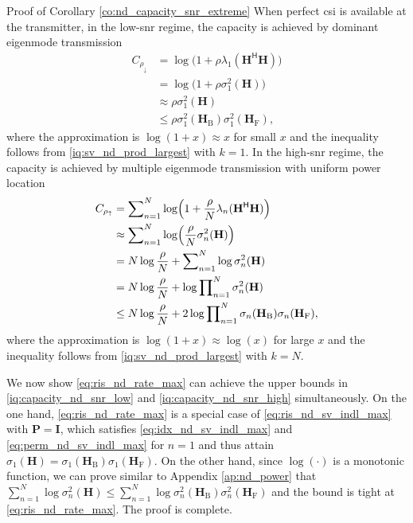 \documentclass[journal]{IEEEtran}
\begin{document}
\begin{appendix}
	\begin{subsection}{Proof of Corollary \ref{co:nd_capacity_snr_extreme}}
		\label{ap:nd_capacity}
		When perfect \gls{csi} is available at the transmitter, in the low-\gls{snr} regime, the capacity is achieved by dominant eigenmode transmission \cite[(5.26)]{Clerckx2013}
		\begin{align*}
			C_{\rho_\downarrow}
			& = \log\bigl(1 + \rho \lambda_1(\mathbf{H}^\mathsf{H} \mathbf{H})\bigr)        \\
			& = \log\bigl(1 + \rho \sigma_1^2(\mathbf{H})\bigr)                             \\
			& \approx \rho \sigma_1^2(\mathbf{H})                                           \\
			& \le \rho \sigma_1^2(\mathbf{H}_\mathrm{B}) \sigma_1^2(\mathbf{H}_\mathrm{F}),
		\end{align*}
		where the approximation is $\log(1 + x) \approx x$ for small $x$ and the inequality follows from \eqref{iq:sv_nd_prod_largest} with $k=1$.
		In the high-\gls{snr} regime, the capacity is achieved by multiple eigenmode transmission with uniform power location \cite[(5.27)]{Clerckx2013}
		\begin{align*}
			C_{\rho_\uparrow}
			& = \sum\nolimits_{n=1}^N \log\Bigl(1 + \frac{\rho}{N} \lambda_n(\mathbf{H}^\mathsf{H} \mathbf{H})\Bigr)                     \\
			& \approx \sum\nolimits_{n=1}^N \log\Bigl(\frac{\rho}{N} \sigma_n^2(\mathbf{H})\Bigr)                                        \\
			& = N \log \frac{\rho}{N} + \sum\nolimits_{n=1}^N \log \sigma_n^2(\mathbf{H})                                                \\
			& = N \log \frac{\rho}{N} + \log \prod\nolimits_{n=1}^N \sigma_n^2(\mathbf{H})                                               \\
			& \le N \log \frac{\rho}{N} + 2 \log \prod\nolimits_{n=1}^N \sigma_n(\mathbf{H}_\mathrm{B}) \sigma_n(\mathbf{H}_\mathrm{F}),
		\end{align*}
		where the approximation is $\log(1 + x) \approx \log(x)$ for large $x$ and the inequality follows from \eqref{iq:sv_nd_prod_largest} with $k=N$.

		We now show \eqref{eq:ris_nd_rate_max} can achieve the upper bounds in \eqref{iq:capacity_nd_snr_low} and \eqref{iq:capacity_nd_snr_high} simultaneously.
		On the one hand, \eqref{eq:ris_nd_rate_max} is a special case of \eqref{eq:ris_nd_sv_indl_max} with $\mathbf{P} = \mathbf{I}$, which satisfies \eqref{eq:idx_nd_sv_indl_max} and \eqref{eq:perm_nd_sv_indl_max} for $n=1$ and thus attain $\sigma_1(\mathbf{H}) = \sigma_1(\mathbf{H}_\mathrm{B}) \sigma_1(\mathbf{H}_\mathrm{F})$.
		On the other hand, since $\log(\cdot)$ is a monotonic function, we can prove similar to Appendix \ref{ap:nd_power} that $\sum_{n=1}^N \log \sigma_n^2(\mathbf{H}) \le \sum_{n=1}^N \log \sigma_n^2(\mathbf{H}_\mathrm{B}) \sigma_n^2(\mathbf{H}_\mathrm{F})$ and the bound is tight at \eqref{eq:ris_nd_rate_max}.
		The proof is complete.
	\end{subsection}


\end{appendix}
\end{document}
